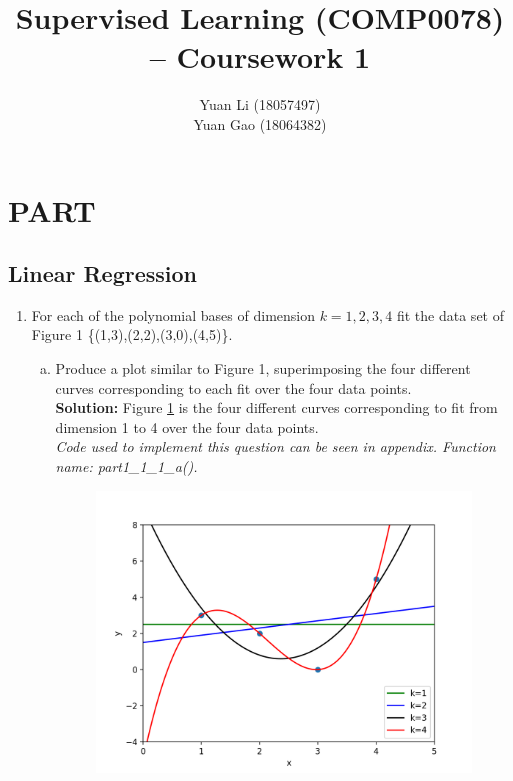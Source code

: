 \documentclass[A4,12pt]{article}
\begin{document}
\title{Supervised Learning (COMP0078) – Coursework 1}
\author{Yuan Li (18057497)\\Yuan Gao (18064382)}
\date{}
\maketitle

\section{PART \uppercase\expandafter{}}
\subsection{Linear Regression}
\begin{enumerate}[1.]
    \item For each of the polynomial bases of dimension $k = 1, 2 , 3, 4$ fit the data set of Figure 1 \{(1,3),(2,2),(3,0),(4,5)\}.
       \begin{enumerate}[(a)]
            \item Produce a plot similar to Figure 1, superimposing the four different curves corresponding to each fit over the four data points.\\
            \textbf{Solution:} Figure \ref{fig:1a} is the four different curves corresponding to fit from dimension 1 to 4 over the four data points. \\
            \textit{Code used to implement this question can be seen in appendix. Function name: part1\_1\_1\_a().}
            \begin{figure}
              \centering \includegraphics[width=0.8\columnwidth]{1a}
              \caption{
                \label{fig:1a}
}
\end{figure}
\end{enumerate}
\end{enumerate}
\end{document}
